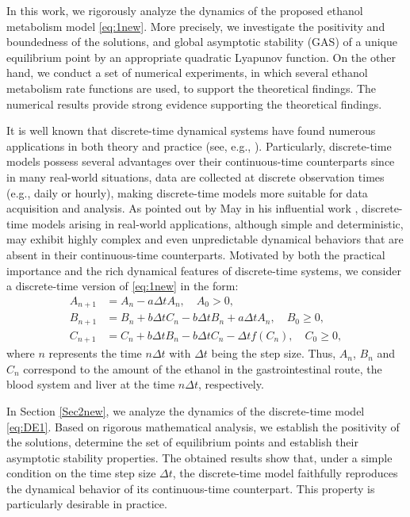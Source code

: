 \documentclass[12pt]{article}
\theoremstyle{definition}
\theoremstyle{remark}
\numberwithin{equation}{section}
\begin{document}
In this work, we rigorously analyze the dynamics of the proposed ethanol metabolism model \eqref{eq:1new}. More precisely, we  investigate the positivity and boundedness of the solutions, and global asymptotic stability (GAS) of a unique equilibrium point by an appropriate quadratic Lyapunov function. On the other hand, we conduct a set of numerical experiments, in which several  ethanol metabolism rate functions are used, to support the theoretical findings. The numerical results provide strong evidence supporting the theoretical findings.



{
It is well known that discrete-time dynamical systems have found numerous applications in both theory and practice (see, e.g., \cite{Allen, Allen1, Elaydi, Ladino, Li, May, Wang}). Particularly, discrete-time models possess several advantages over their continuous-time counterparts since in many real-world situations, data are collected at discrete observation times (e.g., daily or hourly), making discrete-time models more suitable for data acquisition and analysis. As pointed out by May in his influential work \cite{May}, discrete-time models arising in real-world applications, although simple and deterministic, may exhibit highly complex and even unpredictable dynamical behaviors that are absent in their continuous-time counterparts. Motivated by both the practical importance and the rich dynamical features of discrete-time systems, we consider a discrete-time version of \eqref{eq:1new} in the form:
\begin{equation}\label{eq:DE1}
\begin{split}
A_{n + 1} &= A_n  -a\Delta t A_n, \quad A_0 > 0,\\
B_{n+1} &= B_n + b\Delta t C_n - b\Delta t B_n + a\Delta t A_n,\quad B_0 \geq 0,\\
C_{n + 1} &= C_n +  b\Delta t B_n- b\Delta t C_n- \Delta tf(C_n), \quad C_0 \geq 0,
\end{split}
\end{equation}
where $n$ represents the time $n\Delta t$ with $\Delta t$ being the step size. Thus, $A_n$, $B_n$ and $C_n$ correspond to the amount of the ethanol in the gastrointestinal route, the blood system and liver at the time $n\Delta t$, respectively.

In Section \ref{Sec2new}, we analyze the dynamics of the discrete-time model \eqref{eq:DE1}. Based on rigorous mathematical analysis, we establish the positivity of the solutions, determine the set of equilibrium points and establish their asymptotic stability properties. The obtained results show that, under a simple condition on the time step size $\Delta t$, the discrete-time model faithfully reproduces the dynamical behavior of its continuous-time counterpart. This property is particularly desirable in practice.
}
\end{document}
